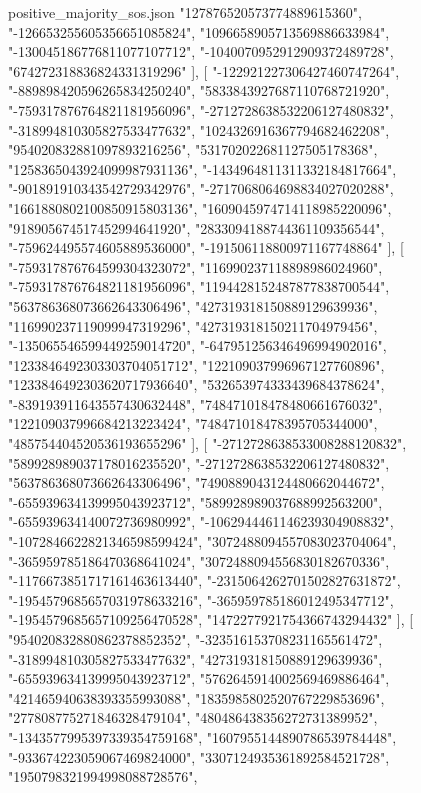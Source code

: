 \begin{filecontents*}[overwrite]{positive_majority_sos.json}
    "127876520573774889615360",
    "-126653255605356651085824",
    "1096658905713569886633984",
    "-130045186776811077107712",
    "-1040070952912909372489728",
    "674272318836824331319296"
   ],
   [
    "-122921227306427460747264",
    "-889898420596265834250240",
    "5833843927687110768721920",
    "-759317876764821181956096",
    "-2712728638532206127480832",
    "-318994810305827533477632",
    "1024326916367794682462208",
    "954020832881097893216256",
    "531702022681127505178368",
    "1258365043924099987931136",
    "-1434964811311332184817664",
    "-901891910343542729342976",
    "-2717068064698834027020288",
    "1661880802100850915803136",
    "1609045974714118985220096",
    "918905674517452994641920",
    "2833094188744361109356544",
    "-759624495574605889536000",
    "-191506118800971167748864"
   ],
   [
    "-759317876764599304323072",
    "116990237118898986024960",
    "-759317876764821181956096",
    "1194428152487877838700544",
    "563786368073662643306496",
    "427319318150889129639936",
    "116990237119099947319296",
    "427319318150211704979456",
    "-135065546599449259014720",
    "-647951256346496994902016",
    "1233846492303303704051712",
    "122109037996967127760896",
    "1233846492303620717936640",
    "532653974333439684378624",
    "-839193911643557430632448",
    "748471018478480661676032",
    "122109037996684213223424",
    "748471018478395705344000",
    "485754404520536193655296"
   ],
   [
    "-2712728638533008288120832",
    "589928989037178016235520",
    "-2712728638532206127480832",
    "563786368073662643306496",
    "7490889043124480662044672",
    "-655939634139995043923712",
    "589928989037688992563200",
    "-655939634140072736980992",
    "-1062944461146239304908832",
    "-1072846622821346598599424",
    "3072488094557083023704064",
    "-365959785186470368641024",
    "3072488094556830182670336",
    "-1176673851717161463613440",
    "-2315064262701502827631872",
    "-1954579685657031978633216",
    "-365959785186012495347712",
    "-1954579685657109256470528",
    "1472277921754366743294432"
   ],
   [
    "954020832880862378852352",
    "-323516153708231165561472",
    "-318994810305827533477632",
    "427319318150889129639936",
    "-655939634139995043923712",
    "5762645914002569469886464",
    "421465940638393355993088",
    "1835985802520767229853696",
    "277808775271846328479104",
    "480486438356272731389952",
    "-1343577995397339354759168",
    "1607955144890786539784448",
    "-933674223059067469824000",
    "3307124935361892584521728",
    "1950798321994998088728576",

\end{filecontents*}
